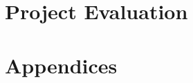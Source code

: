 \documentclass[12pt]{report}
\numberwithin{figure}{chapter}
\begin{document}
\chapter{Project Evaluation}
                                           
\newpage
% 


\appendix
\renewcommand{\thesection}{Appendix \Alph{section}}
\chapter*{Appendices}
\end{document}
